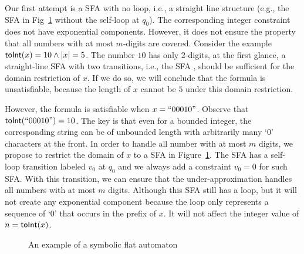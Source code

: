 \documentclass[sigplan,review,anonymous]{acmart}\settopmatter{printfolios=true,printccs=false,printacmref=false}
\begin{document}
Our first attempt is a SFA with no loop, i.e., a straight line structure (e.g., the SFA in Fig~\ref{fig:sfa_its} without the self-loop at $q_0$). The corresponding integer constraint does not have exponential components. However, it does not ensure the property that all numbers with at most $m$-digits are covered. Consider the example $\mbox{\textsf{toInt}($x$)}=10 \wedge |x|=5$. The number $10$ has only $2$-digits, at the first glance, a straight-line SFA with two transitions, i.e., the SFA , should be sufficient for the domain restriction of $x$. If we do so, we will conclude that the formula is unsatisfiable, because the length of $x$ cannot be $5$  under this domain restriction.

However, the formula is satisfiable when $x=``00010"$. Observe that $\mbox{\textsf{toInt}($``00010"$)}=10$. The key is that even for a bounded integer, the corresponding string can be of unbounded length with arbitrarily many `$0$' characters at the front. In order to handle all number with at most $m$ digits, we propose to restrict the domain of $x$ to a SFA in Figure~\ref{fig:sfa_its}.  The SFA has a self-loop transition labeled $v_0$ at $q_0$ and we always add a constraint $v_0=0$ for such SFA. With this transition, we can ensure that the under-approximation handles all numbers with at most $m$ digits. Although this SFA still has a loop, but it will not create any exponential component because the loop only represents a sequence of `0' that occurs in the prefix of $x$. It will not affect the integer value of $n=\mbox{\textsf{toInt}($x$)}$.

\begin{figure}
	
	\caption{An example of a symbolic flat automaton}
	\label{fig:sfa_its}
\end{figure}
\end{document}
